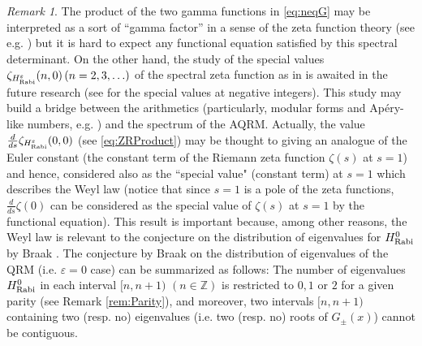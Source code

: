\documentclass[11pt]{article}
\numberwithin{equation}{section}
\newcommand{\Z}{\mathbb{Z}} %
\newcommand{\e}{\varepsilon}
\newcommand{\HRabi}[1]{H_{\text{\upshape Rabi}}^{#1}} %
\theoremstyle{plain}
\theoremstyle{definition}
\theoremstyle{remark}
\newtheorem{rem}{Remark}[section]
\begin{document}
\begin{rem} \label{rem:gammafactor}
  The product of the two gamma functions in  \eqref{eq:neqG} may be interpreted as a sort of  ``gamma factor'' in a sense of the zeta function
  theory (see e.g. \cite{Gon1955PJA}) but it is hard to expect any functional equation satisfied by this spectral determinant. On the other hand,
  the study of the special values $\zeta_{\HRabi{\e}}(n,0)\, (n=2, 3,\ldots)$ of the spectral zeta function as in \cite{KW2007} is awaited in the future
  research (see \cite{RW2019,Sugi2016} for the special values at negative integers). This study may build a bridge between the arithmetics (particularly,
  modular forms and Ap\'ery-like numbers, e.g. \cite{Z2009}) and the spectrum of the AQRM. Actually, the value $\frac{d}{ds}\zeta_{\HRabi{\e}}(0,0)$ (see
  \eqref{eq:ZRProduct})
  may be thought to giving an analogue of the Euler constant (the constant term of the Riemann zeta function $\zeta(s)$ at $s=1$) and hence, considered also
  as the ``special value"
  (constant term) at $s=1$ which describes the Weyl law \cite{Sugi2016} (notice that since $s=1$ is a pole of the zeta functions,
  $\frac{d}{ds}\zeta(0)$ can be considered as the special value of $\zeta(s)$ at $s=1$ by the functional equation). This result is important because,
  among other reasons, the Weyl law  is relevant to the conjecture on the distribution of eigenvalues for $\HRabi{0}$ by Braak \cite{B2011PRL}.
   The conjecture by Braak on the distribution of eigenvalues of the QRM (i.e. $\e=0$ case) can be summarized \cite{BW_personal2017} as
   follows: The number of eigenvalues $\HRabi{0}$ in each interval $[n, n+1)$ $(n\in \Z)$ is restricted to $0, 1$ or $2$ for a given parity
   (see Remark \ref{rem:Parity}), and moreover, two intervals $[n,n+1)$ containing two (resp. no) eigenvalues (i.e. two (resp. no) roots of
   $G_{\pm}(x)$) cannot be contiguous.
\end{rem}
\,
\end{document}

